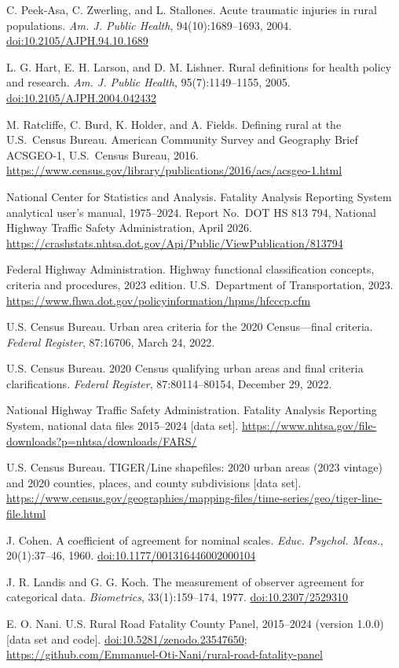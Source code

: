 \documentclass{article}
\begin{document}
\noindent [3] C. Peek-Asa, C. Zwerling, and L. Stallones. Acute traumatic injuries in rural populations. \textit{Am. J. Public Health}, 94(10):1689--1693, 2004. \href{https://doi.org/10.2105/AJPH.94.10.1689}{doi:10.2105/AJPH.94.10.1689}

\noindent [4] L. G. Hart, E. H. Larson, and D. M. Lishner. Rural definitions for health policy and research. \textit{Am. J. Public Health}, 95(7):1149--1155, 2005. \href{https://doi.org/10.2105/AJPH.2004.042432}{doi:10.2105/AJPH.2004.042432}

\noindent [5] M. Ratcliffe, C. Burd, K. Holder, and A. Fields. Defining rural at the U.S.\ Census Bureau. American Community Survey and Geography Brief ACSGEO-1, U.S.\ Census Bureau, 2016. \url{https://www.census.gov/library/publications/2016/acs/acsgeo-1.html}

\noindent [6] National Center for Statistics and Analysis. Fatality Analysis Reporting System analytical user's manual, 1975--2024. Report No.\ DOT HS 813 794, National Highway Traffic Safety Administration, April 2026. \url{https://crashstats.nhtsa.dot.gov/Api/Public/ViewPublication/813794}

\noindent [7] Federal Highway Administration. Highway functional classification concepts, criteria and procedures, 2023 edition. U.S.\ Department of Transportation, 2023. \url{https://www.fhwa.dot.gov/policyinformation/hpms/hfcccp.cfm}

\noindent [8] U.S. Census Bureau. Urban area criteria for the 2020 Census---final criteria. \textit{Federal Register}, 87:16706, March 24, 2022.

\noindent [9] U.S. Census Bureau. 2020 Census qualifying urban areas and final criteria clarifications. \textit{Federal Register}, 87:80114--80154, December 29, 2022.

\noindent [10] National Highway Traffic Safety Administration. Fatality Analysis Reporting System, national data files 2015--2024 [data set]. \url{https://www.nhtsa.gov/file-downloads?p=nhtsa/downloads/FARS/}

\noindent [11] U.S. Census Bureau. TIGER/Line shapefiles: 2020 urban areas (2023 vintage) and 2020 counties, places, and county subdivisions [data set]. \url{https://www.census.gov/geographies/mapping-files/time-series/geo/tiger-line-file.html}

\noindent [12] J. Cohen. A coefficient of agreement for nominal scales. \textit{Educ. Psychol. Meas.}, 20(1):37--46, 1960. \href{https://doi.org/10.1177/001316446002000104}{doi:10.1177/001316446002000104}

\noindent [13] J. R. Landis and G. G. Koch. The measurement of observer agreement for categorical data. \textit{Biometrics}, 33(1):159--174, 1977. \href{https://doi.org/10.2307/2529310}{doi:10.2307/2529310}

\noindent [14] E. O. Nani. U.S. Rural Road Fatality County Panel, 2015--2024 (version 1.0.0) [data set and code]. \href{https://doi.org/10.5281/zenodo.23547650}{doi:10.5281/zenodo.23547650}; \url{https://github.com/Emmanuel-Oti-Nani/rural-road-fatality-panel}
\end{document}
